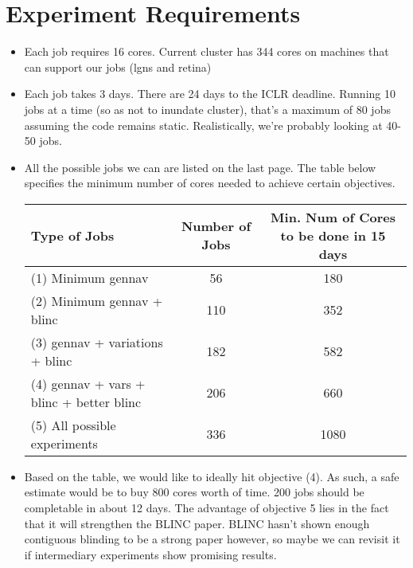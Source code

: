\section{Experiment Requirements}
\begin{itemize}
    \item Each job requires 16 cores. Current cluster has 344 cores on machines that can support our jobs (lgns and retina)
    \item Each job takes 3 days. There are 24 days to the ICLR deadline. Running 10 jobs at a time (so as not to inundate cluster), that's a maximum of 80 jobs assuming the code remains static. Realistically, we're probably looking at 40-50 jobs.
    \item All the possible jobs we can are listed on the last page. The table below specifies the minimum number of cores needed to achieve certain objectives.
        \begin{table}[h]
            \label{sample-table}
            \begin{center}
                \begin{tabular}{|lcc|}
                 \toprule
                    Type of Jobs  & Number of Jobs & Min. Num of Cores to be done in 15 days \\
                 \midrule
                    (1) Minimum gennav         & 56 & 180 \\
                    (2) Minimum gennav + blinc & 110 & 352 \\
                    (3) gennav + variations + blinc & 182 & 582 \\
                    (4) gennav + vars  + blinc + better blinc & 206 & 660 \\
                    (5) All possible experiments & 336 & 1080 \\
                 \bottomrule
              \end{tabular}
            \end{center}                                 
        \end{table}                                      
    \item Based on the table, we would like to ideally hit objective (4). As such, a safe estimate would be to buy 800 cores worth of time. 200 jobs should be completable in about 12 days. The advantage of objective 5 lies in the fact that it will strengthen the BLINC paper. BLINC hasn't shown enough contiguous blinding to be a strong paper however, so maybe we can revisit it if intermediary experiments show promising results.
\end{itemize}

